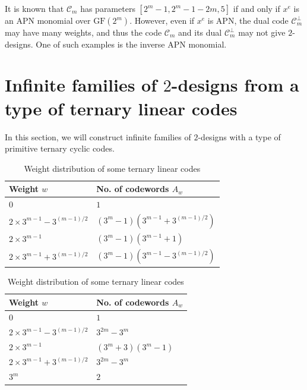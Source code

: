 \documentclass[1p,final]{elsarticle}
\newtheorem{open}{Open Problem}
\newcommand{\gf}{{\mathrm{GF}}}
\newcommand{\C}{{\mathcal{C}}}
\begin{document}
It is known that $\C_m$ has parameters $[2^m-1, 2^m-1-2m, 5]$ if and only if $x^e$ is an APN
monomial over $\gf(2^m)$. However, even if $x^e$ is APN, the dual code $\C_m^\perp$ may have
many weights, and thus the code $\C_m$ and its dual $\C_m^\perp$ may not give $2$-designs.
One of such examples is the inverse APN monomial.



\section{Infinite families of $2$-designs from a type of ternary linear codes}\label{sec-june28}

In this section, we will construct infinite families of $2$-designs with a type of primitive 
ternary cyclic codes.  

\begin{table}[ht]
\caption{Weight distribution of some ternary linear codes}\label{tab-CG3}
\centering
\begin{tabular}{|l|l|}
\hline
Weight $w$    & No. of codewords $A_w$  \\ \hline
$0$                                                        & $1$  \\ 
$2\times 3^{m-1}-3^{(m-1)/2}$           & $(3^m-1)(3^{m-1}+3^{(m-1)/2})$  \\ 
$2\times 3^{m-1}$                            & $(3^m-1)(3^{m-1}+1)$ \\ 
$2\times 3^{m-1}+3^{(m-1)/2}$          & $(3^m-1)(3^{m-1}-3^{(m-1)/2})$ \\ \hline
\end{tabular}
\end{table}


\begin{table}[ht]
\caption{Weight distribution of some ternary linear codes}\label{tab-CG328}
\centering
\begin{tabular}{|l|l|}
\hline
Weight $w$    & No. of codewords $A_w$  \\ \hline
$0$                                                        & $1$  \\ 
$2\times 3^{m-1}-3^{(m-1)/2}$           & $3^{2m}-3^m$  \\ 
$2\times 3^{m-1}$                            & $(3^m+3)(3^m-1)$ \\ 
$2\times 3^{m-1}+3^{(m-1)/2}$          & $3^{2m}-3^m$ \\ \hline
$3^m$                                  &  $2$ \\ \hline 
\end{tabular}
\end{table}
\end{document}

